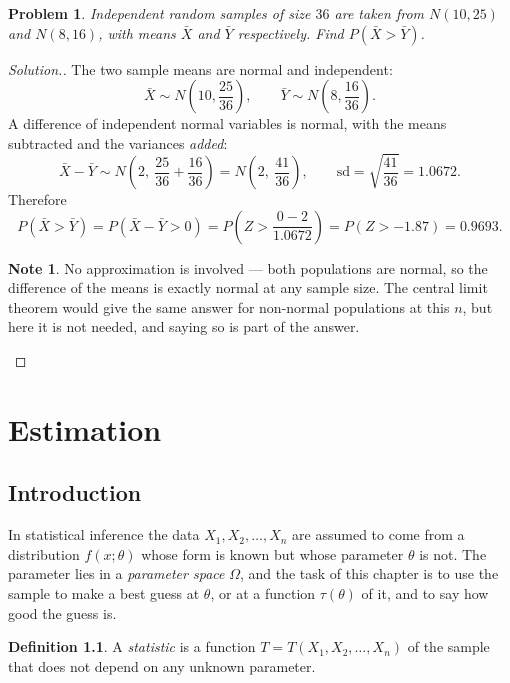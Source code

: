 \documentclass[12pt,a4paper]{report}
\theoremstyle{definition}
\newtheorem{definition}[thm]{Definition}
\newtheorem{note}[thm]{Note}
\theoremstyle{plain}
\newtheorem{problemx}{Problem}[section]
\newenvironment{problem}{\begin{problemx}}{\end{problemx}}
\newenvironment{solution}
  {\renewcommand{\qedsymbol}{}\begin{proof}[\textit{Solution}.]}
  {\end{proof}}
\begin{document}
\begin{problem}
Independent random samples of size $36$ are taken from $N(10,25)$ and $N(8,16)$,
with means $\bar X$ and $\bar Y$ respectively. Find $P\left(\bar X>\bar Y\right)$.
\end{problem}

\begin{solution}
The two sample means are normal and independent:
\[\bar X\sim N\!\left(10,\frac{25}{36}\right),\qquad
\bar Y\sim N\!\left(8,\frac{16}{36}\right).\]
A difference of independent normal variables is normal, with the means subtracted
and the variances \emph{added}:
\[\bar X-\bar Y\sim N\!\left(2,\ \frac{25}{36}+\frac{16}{36}\right)
=N\!\left(2,\ \frac{41}{36}\right),\qquad
\text{sd}=\sqrt{\frac{41}{36}}=1.0672.\]
Therefore
\[P\left(\bar X>\bar Y\right)=P\left(\bar X-\bar Y>0\right)
=P\!\left(Z>\frac{0-2}{1.0672}\right)=P(Z>-1.87)=0.9693.\]

\begin{note}
No approximation is involved --- both populations are normal, so the difference of
the means is exactly normal at any sample size. The central limit theorem would
give the same answer for non-normal populations at this $n$, but here it is not
needed, and saying so is part of the answer.
\end{note}
\end{solution}

\chapter{Estimation}

\section{Introduction}

In statistical inference the data $X_1, X_2, \dots, X_n$ are assumed to come
from a distribution $f(x; \theta)$ whose form is known but whose parameter
$\theta$ is not. The parameter lies in a \emph{parameter space} $\Omega$, and the
task of this chapter is to use the sample to make a best guess at $\theta$, or at
a function $\tau(\theta)$ of it, and to say how good the guess is.

\begin{definition}
\label{def:statistic}
A \emph{statistic} is a function $T = T(X_1, X_2, \dots , X_n)$ of the sample
that does not depend on any unknown parameter.
\end{definition}
\end{document}
